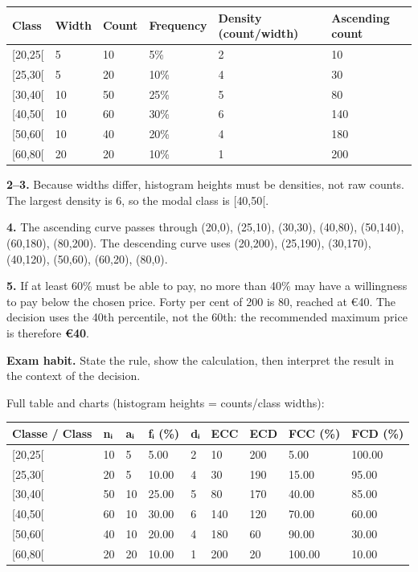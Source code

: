 \documentclass[11pt,a4paper]{article}
\begin{document}
\begin{longtable}[]{@{}llllll@{}}
\toprule\noalign{}
Class & Width & Count & Frequency & Density (count/width) & Ascending count \\
\midrule\noalign{}
\endhead
\bottomrule\noalign{}
\endlastfoot
{[}20,25{[} & 5 & 10 & 5\% & 2 & 10 \\
{[}25,30{[} & 5 & 20 & 10\% & 4 & 30 \\
{[}30,40{[} & 10 & 50 & 25\% & 5 & 80 \\
{[}40,50{[} & 10 & 60 & 30\% & 6 & 140 \\
{[}50,60{[} & 10 & 40 & 20\% & 4 & 180 \\
{[}60,80{[} & 20 & 20 & 10\% & 1 & 200 \\
\end{longtable}

\textbf{2--3.} Because widths differ, histogram heights must be densities, not raw counts. The largest density is 6, so the modal class is {[}40,50{[}.

\textbf{4.} The ascending curve passes through (20,0), (25,10), (30,30), (40,80), (50,140), (60,180), (80,200). The descending curve uses (20,200), (25,190), (30,170), (40,120), (50,60), (60,20), (80,0).

\textbf{5.} If at least 60\% must be able to pay, no more than 40\% may have a willingness to pay below the chosen price. Forty per cent of 200 is 80, reached at €40. The decision uses the 40th percentile, not the 60th: the recommended maximum price is therefore \textbf{€40}.

\textbf{Exam habit.} State the rule, show the calculation, then interpret the result in the context of the decision.

Full table and charts (histogram heights = counts/class widths):

\begin{longtable}[]{@{}lllllllll@{}}
\toprule\noalign{}
Classe / Class & nᵢ & aᵢ & fᵢ (\%) & dᵢ & ECC & ECD & FCC (\%) & FCD (\%) \\
\midrule\noalign{}
\endhead
\bottomrule\noalign{}
\endlastfoot
{[}20,25{[} & 10 & 5 & 5.00 & 2 & 10 & 200 & 5.00 & 100.00 \\
{[}25,30{[} & 20 & 5 & 10.00 & 4 & 30 & 190 & 15.00 & 95.00 \\
{[}30,40{[} & 50 & 10 & 25.00 & 5 & 80 & 170 & 40.00 & 85.00 \\
{[}40,50{[} & 60 & 10 & 30.00 & 6 & 140 & 120 & 70.00 & 60.00 \\
{[}50,60{[} & 40 & 10 & 20.00 & 4 & 180 & 60 & 90.00 & 30.00 \\
{[}60,80{[} & 20 & 20 & 10.00 & 1 & 200 & 20 & 100.00 & 10.00 \\
\end{longtable}
\end{document}

